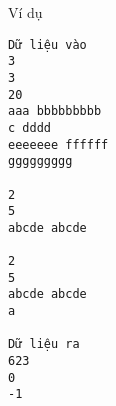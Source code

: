 Ví dụ
\begin{verbatim}
Dữ liệu vào
3
3
20
aaa bbbbbbbbb 
c dddd
eeeeeee ffffff
ggggggggg

2
5
abcde abcde

2
5
abcde abcde 
a

Dữ liệu ra
623
0
-1
\end{verbatim}